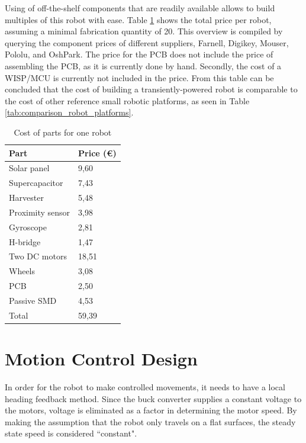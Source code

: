 Using of off-the-shelf components that are readily available allows to build multiples of this robot with ease.
Table \ref{tab:cost_robot} shows the total price per robot, assuming a minimal fabrication quantity of 20.
This overview is compiled by querying the component prices of different suppliers, Farnell, Digikey, Mouser, Pololu, and OshPark.
The price for the PCB does not include the price of assembling the PCB, as it is currently done by hand.
Secondly, the cost of a WISP/MCU is currently not included in the price.
From this table can be concluded that the cost of building a transiently-powered robot is comparable to the cost of other reference small robotic platforms, as seen in Table \ref{tab:comparison_robot_platforms}.


\begin{table}[t]
	\centering
	\caption{Cost of parts for one robot}
	\label{tab:cost_robot}
	\begin{tabular}{|l|l|} 
		\hline
		Part & Price (\euro) \\
		\hline\hline
		Solar panel & 9,60\\
		Supercapacitor & 7,43\\
		Harvester & 5,48 \\
		Proximity sensor & 3,98 \\
		Gyroscope & 2,81\\	
		H-bridge & 1,47 \\
		Two DC motors & 18,51 \\
		Wheels & 3,08\\
		PCB & 2,50 \\
		Passive SMD & 4,53\\
		\hline \hline
		Total & 59,39 \\
		\hline
	\end{tabular}
\end{table}


\section{Motion Control Design}
\label{sec:dai_control_design}
In order for the robot to make controlled movements, it needs to have a local heading feedback method.
Since the buck converter supplies a constant voltage to the motors, voltage is eliminated as a factor in determining the motor speed.
By making the assumption that the robot only travels on a flat surfaces, the steady state speed is considered ``constant".


